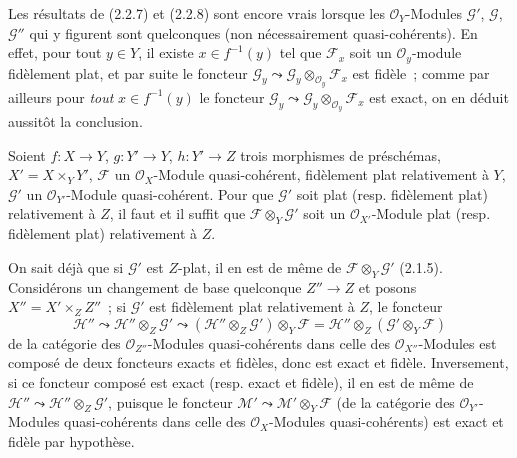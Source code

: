 \begin{remark}[2.2.9]
\label{IV.2.2.9-fr}
Les résultats de (2.2.7) et (2.2.8) sont encore vrais lorsque les
$\mathcal O_Y$-Modules $\mathscr G'$, $\mathscr G$, $\mathscr G''$ qui y
figurent sont quelconques (non nécessairement quasi-cohérents). En effet,
pour tout $y\in Y$, il existe $x\in f^{-1}(y)$ tel que $\mathscr F_x$ soit un
$\mathcal O_y$-module
fidèlement plat, et par suite le foncteur
$\mathscr G_y\leadsto\mathscr G_y\otimes_{\mathcal O_y}\mathscr F_x$ est
fidèle~; comme par ailleurs pour \emph{tout} $x\in f^{-1}(y)$ le foncteur
$\mathscr G_y\leadsto\mathscr G_y\otimes_{\mathcal O_y}\mathscr F_x$ est
exact, on en déduit aussitôt la conclusion.
\end{remark}

\begin{proposition}[2.2.10]
\label{IV.2.2.10-fr}
Soient $f:X\to Y$, $g:Y'\to Y$, $h:Y'\to Z$ trois morphismes de préschémas,
$X'=X\times_Y Y'$, $\mathscr F$ un $\mathcal O_X$-Module quasi-cohérent,
fidèlement plat relativement à $Y$, $\mathscr G'$ un
$\mathcal O_{Y'}$-Module quasi-cohérent. Pour que $\mathscr G'$ soit plat
\textup{(resp.} fidèlement plat) relativement à $Z$, il faut et il suffit que
$\mathscr F\otimes_Y\mathscr G'$ soit un $\mathcal O_{X'}$-Module plat
\textup{(resp.} fidèlement plat) relativement à $Z$.
\end{proposition}

On sait déjà que si $\mathscr G'$ est $Z$-plat, il en est de même de
$\mathscr F\otimes_Y\mathscr G'$ (2.1.5). Considérons un changement de base
quelconque $Z''\to Z$ et posons $X''=X'\times_Z Z''$~; si $\mathscr G'$ est
fidèlement plat relativement à $Z$, le foncteur
\begin{equation}
\tag{2.2.10.1}
\label{IV.2.2.10.1-fr}
\mathscr H''\leadsto\mathscr H''\otimes_Z\mathscr G'
\leadsto(\mathscr H''\otimes_Z\mathscr G')\otimes_Y\mathscr F
=\mathscr H''\otimes_Z(\mathscr G'\otimes_Y\mathscr F)
\end{equation}
de la catégorie des $\mathcal O_{Z''}$-Modules quasi-cohérents dans celle des
$\mathcal O_{X''}$-Modules est composé de deux foncteurs exacts et fidèles,
donc est exact et fidèle. Inversement, si ce foncteur composé est exact (resp.
exact et fidèle), il en est de même de
$\mathscr H''\leadsto\mathscr H''\otimes_Z\mathscr G'$, puisque le foncteur
$\mathscr M'\leadsto\mathscr M'\otimes_Y\mathscr F$ (de la catégorie des
$\mathcal O_{Y'}$-Modules quasi-cohérents dans celle des
$\mathcal O_X$-Modules quasi-cohérents) est exact et fidèle par hypothèse.

